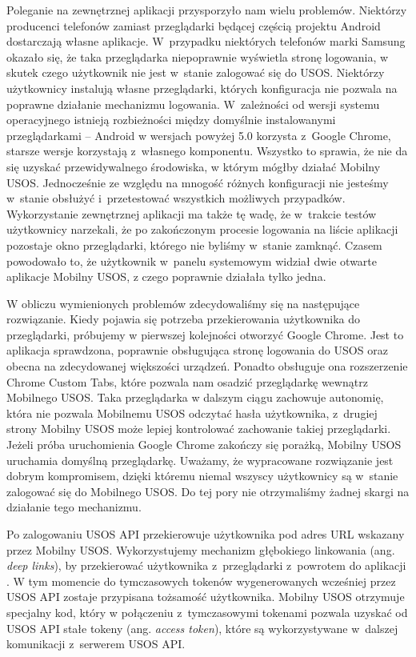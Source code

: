 \documentclass{pracamgr}
\begin{document}
Poleganie na zewnętrznej aplikacji przysporzyło nam wielu problemów. Niektórzy
producenci telefonów zamiast przeglądarki będącej częścią projektu Android
dostarczają własne aplikacje. W~przypadku niektórych telefonów marki Samsung
okazało się, że taka przeglądarka niepoprawnie wyświetla stronę logowania, w
skutek czego użytkownik nie jest w~stanie zalogować się do USOS. Niektórzy
użytkownicy instalują własne przeglądarki, których konfiguracja nie pozwala na
poprawne działanie mechanizmu logowania. W~zależności od wersji systemu operacyjnego
istnieją rozbieżności między domyślnie instalowanymi przeglądarkami -- Android w
wersjach powyżej 5.0 korzysta z~Google Chrome, starsze wersje korzystają z~własnego
komponentu. Wszystko to sprawia, że nie da się uzyskać przewidywalnego środowiska,
w którym mógłby działać Mobilny USOS. Jednocześnie ze względu na mnogość różnych
konfiguracji nie jesteśmy w~stanie obsłużyć i~przetestować wszystkich możliwych
przypadków. Wykorzystanie zewnętrznej aplikacji ma także tę wadę, że w~trakcie
testów użytkownicy narzekali, że po zakończonym procesie logowania na liście aplikacji
pozostaje okno przeglądarki, którego nie byliśmy w~stanie zamknąć. Czasem powodowało
to, że użytkownik w~panelu systemowym widział dwie otwarte aplikacje Mobilny USOS,
z czego poprawnie działała tylko jedna.

W obliczu wymienionych problemów zdecydowaliśmy się na następujące rozwiązanie.
Kiedy pojawia się potrzeba przekierowania użytkownika do przeglądarki, próbujemy
w pierwszej kolejności otworzyć Google Chrome. Jest to aplikacja sprawdzona,
poprawnie obsługująca stronę logowania do USOS oraz obecna na zdecydowanej
większości urządzeń. Ponadto obsługuje ona rozszerzenie Chrome Custom Tabs, które
pozwala nam osadzić przeglądarkę wewnątrz Mobilnego USOS. Taka przeglądarka w
dalszym ciągu zachowuje autonomię, która nie pozwala Mobilnemu USOS odczytać
hasła użytkownika, z~drugiej strony Mobilny USOS może lepiej kontrolować zachowanie
takiej przeglądarki. Jeżeli próba uruchomienia Google Chrome zakończy się porażką,
Mobilny USOS uruchamia domyślną przeglądarkę. Uważamy, że wypracowane rozwiązanie
jest dobrym kompromisem, dzięki któremu niemal wszyscy użytkownicy są w~stanie
zalogować się do Mobilnego USOS. Do tej pory nie otrzymaliśmy żadnej skargi na
działanie tego mechanizmu.

Po zalogowaniu USOS API przekierowuje użytkownika pod adres URL wskazany przez Mobilny USOS.
Wykorzystujemy mechanizm głębokiego linkowania (ang. \textit{deep links}),
by przekierować użytkownika z~przeglądarki z~powrotem do aplikacji \cite{deeplinks}.
W tym momencie do tymczasowych tokenów wygenerowanych wcześniej przez USOS API zostaje
przypisana tożsamość użytkownika. Mobilny USOS otrzymuje specjalny kod, który w
połączeniu z~tymczasowymi tokenami pozwala uzyskać od USOS API stałe tokeny (ang.
\textit{access token}), które są wykorzystywane w~dalszej komunikacji z~serwerem
USOS API.
\end{document}
